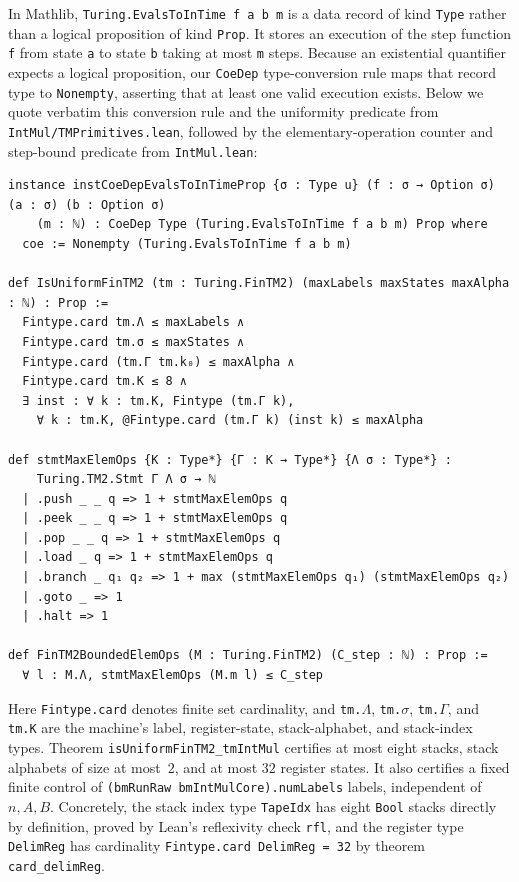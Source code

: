 In Mathlib, \texttt{Turing.\allowbreak EvalsToInTime f a b m} is a data record of kind \texttt{Type} rather than a logical proposition of kind \texttt{Prop}. It stores an execution of the step function \texttt{f} from state \texttt{a} to state \texttt{b} taking at most \texttt{m} steps. Because an existential quantifier expects a logical proposition, our \texttt{CoeDep} type-conversion rule maps that record type to \texttt{Nonempty}, asserting that at least one valid execution exists. Below we quote verbatim this conversion rule and the uniformity predicate from \texttt{IntMul/\allowbreak TMPrimitives.lean}, followed by the elementary-operation counter and step-bound predicate from \texttt{IntMul.lean}:
\begin{Verbatim}[fontsize=\footnotesize,frame=single,framesep=2mm]
instance instCoeDepEvalsToInTimeProp {σ : Type u} (f : σ → Option σ) (a : σ) (b : Option σ)
    (m : ℕ) : CoeDep Type (Turing.EvalsToInTime f a b m) Prop where
  coe := Nonempty (Turing.EvalsToInTime f a b m)

def IsUniformFinTM2 (tm : Turing.FinTM2) (maxLabels maxStates maxAlpha : ℕ) : Prop :=
  Fintype.card tm.Λ ≤ maxLabels ∧
  Fintype.card tm.σ ≤ maxStates ∧
  Fintype.card (tm.Γ tm.k₀) ≤ maxAlpha ∧
  Fintype.card tm.K ≤ 8 ∧
  ∃ inst : ∀ k : tm.K, Fintype (tm.Γ k),
    ∀ k : tm.K, @Fintype.card (tm.Γ k) (inst k) ≤ maxAlpha

def stmtMaxElemOps {K : Type*} {Γ : K → Type*} {Λ σ : Type*} :
    Turing.TM2.Stmt Γ Λ σ → ℕ
  | .push _ _ q => 1 + stmtMaxElemOps q
  | .peek _ _ q => 1 + stmtMaxElemOps q
  | .pop _ _ q => 1 + stmtMaxElemOps q
  | .load _ q => 1 + stmtMaxElemOps q
  | .branch _ q₁ q₂ => 1 + max (stmtMaxElemOps q₁) (stmtMaxElemOps q₂)
  | .goto _ => 1
  | .halt => 1

def FinTM2BoundedElemOps (M : Turing.FinTM2) (C_step : ℕ) : Prop :=
  ∀ l : M.Λ, stmtMaxElemOps (M.m l) ≤ C_step
\end{Verbatim}

{\sloppy Here \texttt{Fintype.card} denotes finite set cardinality, and \texttt{tm.$\Lambda$}, \texttt{tm.$\sigma$}, \texttt{tm.$\Gamma$}, and \texttt{tm.K} are the machine's label, register-state, stack-alphabet, and stack-index types. Theorem \texttt{isUniform\allowbreak FinTM2\_\allowbreak tmIntMul} certifies at most eight stacks, stack alphabets of size at most~$2$, and at most $32$ register states. It also certifies a fixed finite control of \texttt{(bmRunRaw\allowbreak\ bmIntMulCore).\allowbreak numLabels} labels, independent of $n, A, B$. Concretely, the stack index type \texttt{TapeIdx} has eight \texttt{Bool} stacks directly by definition, proved by Lean's reflexivity check \texttt{rfl}, and the register type \texttt{DelimReg} has cardinality \texttt{Fintype.\allowbreak card DelimReg = 32} by theorem \texttt{card\_\allowbreak delimReg}.\par}

